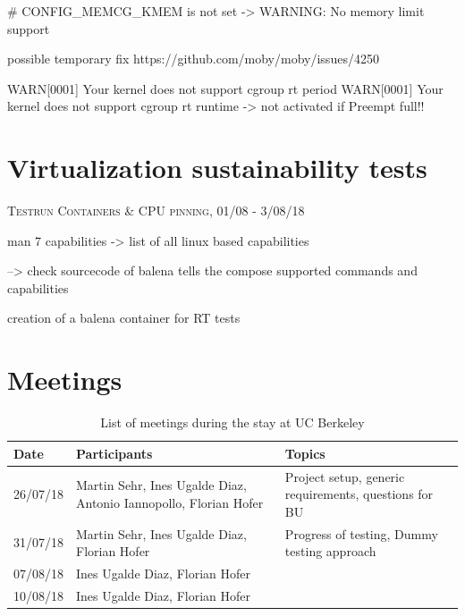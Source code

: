 \documentclass[]{scrartcl}
\begin{document}
# CONFIG_MEMCG_KMEM is not set -> WARNING: No memory limit support

possible temporary fix https://github.com/moby/moby/issues/4250



WARN[0001] Your kernel does not support cgroup rt period 
WARN[0001] Your kernel does not support cgroup rt runtime 
-> not activated if Preempt full!!

\section{Virtualization sustainability tests}

{\small\textsc{Testrun Containers \& CPU pinning, 01/08 - 3/08/18} \bigskip}



man 7 capabilities  -> list of all linux based capabilities


--> check sourcecode of balena tells the compose supported commands and capabilities

creation of a balena container for RT tests


\section{Meetings}

\begin{table}
	\centering
	\caption{List of meetings during the stay at UC Berkeley}
	
	\begin{tabular}{l l l}
	Date & Participants & Topics \\
	\hline
	26/07/18 & Martin Sehr, Ines Ugalde Diaz, Antonio Iannopollo, Florian Hofer & Project setup, generic requirements, questions for BU\\
	31/07/18 & Martin Sehr, Ines Ugalde Diaz, Florian Hofer & Progress of testing, Dummy testing approach\\
	07/08/18 & Ines Ugalde Diaz, Florian Hofer & \\
	10/08/18 & Ines Ugalde Diaz, Florian Hofer & \\
	\hline
	\end{tabular}
	
	\label{tab:meeting}
\end{table}
\end{document}
